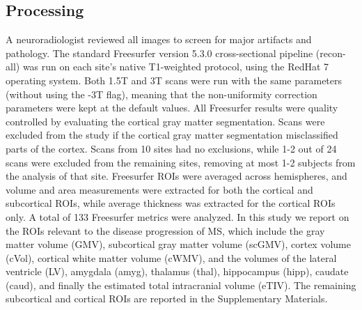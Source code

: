 \subsection{Processing}
 A neuroradiologist reviewed all images to screen for major artifacts and pathology. The standard Freesurfer \cite{freesurferPaper} version 5.3.0 cross-sectional pipeline (recon-all) was run on each site's native T1-weighted protocol, using the RedHat 7 operating system. Both 1.5T and 3T scans were run with the same parameters (without using the -3T flag), meaning that the non-uniformity correction parameters were kept at the default values. All Freesurfer results were quality controlled by evaluating the cortical gray matter segmentation. Scans were excluded from the study if the cortical gray matter segmentation misclassified parts of the cortex. Scans from 10 sites had no exclusions, while 1-2 out of 24 scans were excluded from the remaining sites, removing at most 1-2 subjects from the analysis of that site. Freesurfer ROIs were averaged across hemispheres, and volume and area measurements were extracted for both the cortical and subcortical ROIs, while average thickness was extracted for the cortical ROIs only. A total of 133 Freesurfer metrics were analyzed. In this study we report on the ROIs relevant to the disease progression of MS, which include the gray matter volume (GMV), subcortical gray matter volume (scGMV), cortex volume (cVol), cortical white matter volume (cWMV), and the volumes of the lateral ventricle (LV), amygdala (amyg), thalamus (thal), hippocampus (hipp), caudate (caud), and finally the estimated total intracranial volume (eTIV). The remaining subcortical  and cortical ROIs are reported in the Supplementary Materials.
